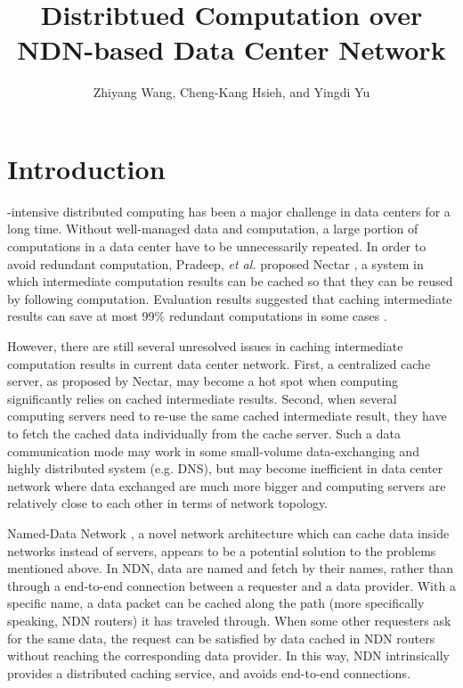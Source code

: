 \documentclass[journal]{IEEEtran}
\begin{document}
\title{Distribtued Computation over NDN-based Data Center Network}

\author{Zhiyang Wang,
        Cheng-Kang Hsieh,
        and Yingdi Yu}

\maketitle






\section{Introduction}
-intensive distributed computing has been a major challenge
in data centers for a long time.  Without well-managed data and computation, a
large portion of computations in a data center have to be unnecessarily
repeated.  In order to avoid redundant computation, Pradeep, {\it et al.}
proposed Nectar \cite{gunda2010nectar}, a system in which intermediate computation
results can be cached so that they can be reused by following computation.
Evaluation results suggested that caching intermediate results can save at most
99\% redundant computations in some cases \cite{gunda2010nectar}.

However, there are still several unresolved issues in caching intermediate
computation results in current data center network.  First, a centralized cache
server, as proposed by Nectar, may become a hot spot when computing
significantly relies on cached intermediate results.  Second, when several
computing servers need to re-use the same cached intermediate result, they have
to fetch the cached data individually from the cache server.  Such a data
communication mode may work in some small-volume data-exchanging and highly
distributed system (e.g. DNS), but may become inefficient in data center network
where data exchanged are much more bigger and computing servers are relatively
close to each other in terms of network topology.

Named-Data Network \cite{jacobson2009networking}, a novel network architecture
which can cache data inside networks instead of servers, appears to be a
potential solution to the problems mentioned above.  In NDN, data are named and
fetch by their names, rather than through a end-to-end connection between a
requester and a data provider.  With a specific name, a data packet can be
cached along the path (more specifically speaking, NDN routers) it has traveled
through.  When some other requesters ask for the same data, the request can be
satisfied by data cached in NDN routers without reaching the corresponding data
provider.  In this way, NDN intrinsically provides a distributed caching
service, and avoids end-to-end connections. 
\end{document}

